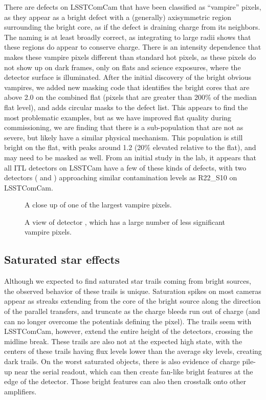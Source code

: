 There are defects on LSSTComCam that have been classified as ``vampire'' pixels, as they appear as a bright defect with a (generally) axisymmetric region surrounding the bright core, as if the defect is draining charge from its neighbors.
The naming is at least broadly correct, as integrating to large radii shows that these regions do appear to conserve charge.
There is an intensity dependence that makes these vampire pixels different than standard hot pixels, as these pixels do not show up on dark frames, only on flats and science exposures, where the detector surface is illuminated.
After the initial discovery of the bright obvious vampires, we added new masking code that identifies the bright cores that are above 2.0 on the combined flat (pixels that are greater than 200\% of the median flat level), and adds circular masks to the defect list.
This appears to find the most problematic examples, but as we have improved flat quality during commissioning, we are finding that there is a sub-population that are not as severe, but likely have a similar physical mechanism.
This population is still bright on the flat, with peaks around 1.2 (20\% elevated relative to the flat), and may need to be masked as well.
From an initial study in the lab, it appears that all ITL detectors on LSSTCam have a few of these kinds of defects, with two detectors ( and ) approaching similar contamination levels as R22_S10 on LSSTComCam.

\begin{figure}
  \caption{A close up of one of the largest vampire pixels.}
\end{figure}

\begin{figure}
  \caption{A view of detector , which has a large number of less significant vampire pixels.}
\end{figure}


\subsection{Saturated star effects}

Although we expected to find saturated star trails coming from bright sources, the observed behavior of these trails is unique.
Saturation spikes on most cameras appear as streaks extending from the core of the bright source along the direction of the parallel transfers, and truncate as the charge bleeds run out of charge (and can no longer overcome the potentials defining the pixel).
The trails seem with LSSTComCam, however, extend the entire height of the detectors, crossing the midline break.
These trails are also not at the expected high state, with the centers of these trails having flux levels lower than the average sky levels, creating dark trails.
On the worst saturated objects, there is also evidence of charge pile-up near the serial readout, which can then create fan-like bright features at the edge of the detector.
Those bright features can also then crosstalk onto other amplifiers.


